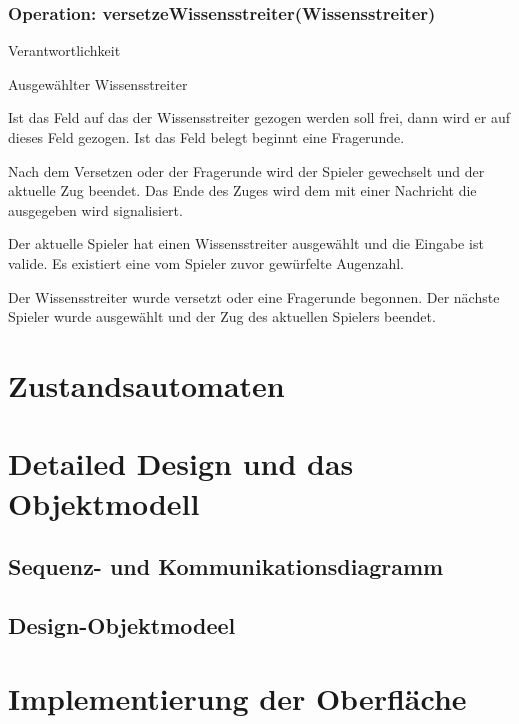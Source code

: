 \subsubsection{Operation: versetzeWissensstreiter(Wissensstreiter)}
\begin{labeling}[:]{Verantwortlichkeit}
\item [Parameter] Ausgewählter Wissensstreiter
\item [Verantwortlichkeit] Ist das Feld auf das der Wissensstreiter gezogen werden soll frei, dann wird er auf dieses Feld gezogen. Ist das Feld belegt beginnt eine Fragerunde.

Nach dem Versetzen oder der Fragerunde wird der Spieler gewechselt und der aktuelle Zug beendet. Das Ende des Zuges wird dem mit einer Nachricht die ausgegeben wird signalisiert.

\item [Ausnahmen]
\item [Vorbedingungen] Der aktuelle Spieler hat einen Wissensstreiter ausgewählt und die Eingabe ist valide. Es existiert eine vom Spieler zuvor gewürfelte Augenzahl.
\item [Nachbedingungen] Der Wissensstreiter wurde versetzt oder eine Fragerunde begonnen. Der nächste Spieler wurde ausgewählt und der Zug des aktuellen Spielers beendet.
\end{labeling}

\section{Zustandsautomaten}

\section{Detailed Design und das Objektmodell}

\subsection{Sequenz- und Kommunikationsdiagramm}

\subsection{Design-Objektmodeel}

\section{Implementierung der Oberfläche}
